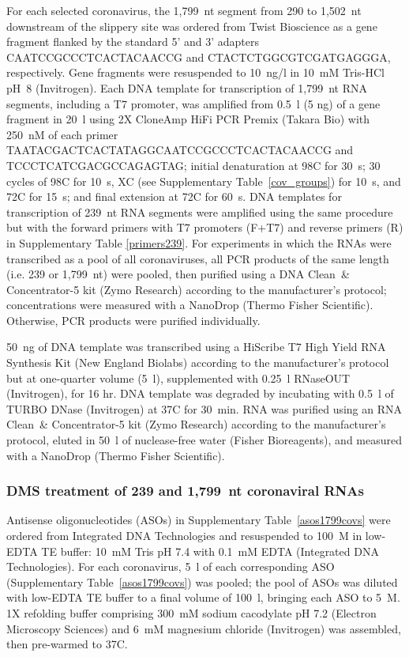 \documentclass[main.tex]{subfiles}
\begin{document}
For each selected coronavirus, the 1,799~nt segment from 290 to 1,502~nt downstream of the slippery site was ordered from Twist Bioscience as a gene fragment flanked by the standard 5' and 3' adapters CAATCCGCCCTCACTACAACCG and CTACTCTGGCGTCGATGAGGGA, respectively.
Gene fragments were resuspended to 10~ng/\textmu l in 10~mM Tris-HCl pH~8 (Invitrogen).
Each DNA template for transcription of 1,799~nt RNA segments, including a T7 promoter, was amplified from 0.5~\textmu l (5 ng) of a gene fragment in 20~\textmu l using 2X CloneAmp HiFi PCR Premix (Takara Bio) with 250~nM of each primer TAATACGACTCACTATAGGCAATCCGCCCTCACTACAACCG and TCCCTCATCGACGCCAGAGTAG; initial denaturation at 98\textdegree C for 30~s; 30 cycles of 98\textdegree C for 10~s, X\textdegree C (see Supplementary Table~\ref{cov_groups}) for 10~s, and 72\textdegree C for 15~s; and final extension at 72\textdegree C for 60~s.
DNA templates for transcription of 239~nt RNA segments were amplified using the same procedure but with the forward primers with T7 promoters (F+T7) and reverse primers (R) in Supplementary Table \ref{primers239}.
For experiments in which the RNAs were transcribed as a pool of all coronaviruses, all PCR products of the same length (i.e. 239 or 1,799~nt) were pooled, then purified using a DNA Clean~\& Concentrator-5 kit (Zymo Research) according to the manufacturer's protocol; concentrations were measured with a NanoDrop (Thermo Fisher Scientific).
Otherwise, PCR products were purified individually.

50~ng of DNA template was transcribed using a HiScribe T7 High Yield RNA Synthesis Kit (New England Biolabs) according to the manufacturer's protocol but at one-quarter volume (5~\textmu l), supplemented with 0.25~\textmu l RNaseOUT (Invitrogen), for 16 hr.
DNA template was degraded by incubating with 0.5~\textmu l of TURBO DNase (Invitrogen) at 37\textdegree C for 30~min.
RNA was purified using an RNA Clean~\& Concentrator-5 kit (Zymo Research) according to the manufacturer's protocol, eluted in 50~\textmu l of nuclease-free water (Fisher Bioreagents), and measured with a NanoDrop (Thermo Fisher Scientific).

\subsubsection{DMS treatment of 239 and 1,799~nt coronaviral RNAs}

Antisense oligonucleotides (ASOs) in Supplementary Table~\ref{asos1799covs} were ordered from Integrated DNA Technologies and resuspended to 100~\textmu M in low-EDTA TE buffer: 10~mM Tris pH 7.4 with 0.1~mM EDTA (Integrated DNA Technologies).
For each coronavirus, 5~\textmu l of each corresponding ASO (Supplementary Table~\ref{asos1799covs}) was pooled; the pool of ASOs was diluted with low-EDTA TE buffer to a final volume of 100~\textmu l, bringing each ASO to 5~\textmu M.
1X refolding buffer comprising 300~mM sodium cacodylate pH 7.2 (Electron Microscopy Sciences) and 6~mM magnesium chloride (Invitrogen) was assembled, then pre-warmed to 37\textdegree C.
\end{document}
